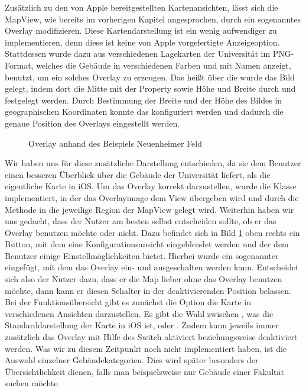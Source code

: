 \documentclass{report}
\begin{document}
Zusätzlich zu den von Apple bereitgestellten Kartenansichten, lässt sich die MapView, wie bereits im vorherigen Kapitel angesprochen, durch ein sogenanntes Overlay modifizieren. Diese Kartendarstellung ist ein wenig aufwendiger zu implementieren, denn diese ist keine von Apple vorgefertigte Anzeigeoption. Stattdessen wurde dazu aus verschiedenen Lagekarten der Universität im PNG-Format, welches die Gebäude in verschiedenen Farben und mit Namen anzeigt, benutzt, um ein solches Overlay zu erzeugen. Das heißt über die  wurde das Bild gelegt, indem dort die Mitte mit der Property  sowie Höhe und Breite durch  und  festgelegt werden. Durch Bestimmung der Breite  und der Höhe  des Bildes in geographischen Koordinaten konnte das  konfiguriert werden und dadurch die genaue Position des Overlays eingestellt werden. 

\begin{figure}[ht]
\centering {}
\caption{Overlay anhand des Beispiels Neuenheimer Feld}\label{bild_4}
\end{figure}

Wir haben uns für diese zusätzliche Darstellung entschieden, da sie dem Benutzer einen besseren Überblick über die Gebäude der Universität liefert, als die eigentliche Karte in iOS. Um das Overlay korrekt darzustellen, wurde die Klasse  implementiert, in der das Overlayimage dem View übergeben wird und durch die Methode  in die jeweilige Region der MapView gelegt wird. Weiterhin haben wir uns gedacht, dass der Nutzer am besten selbst entscheiden sollte, ob er das Overlay benutzen möchte oder nicht. Dazu befindet sich in Bild \ref{bild_4} oben rechts ein Button, mit dem eine Konfigurationsansicht eingeblendet werden und der dem Benutzer einige Einstellmöglichkeiten bietet. Hierbei wurde ein sogenannter  eingefügt, mit dem das Overlay ein- und ausgeschalten werden kann. Entscheidet sich also der Nutzer dazu, dass er die Map lieber ohne das Overlay benutzen möchte, dann kann er diesen Schalter in der deaktivierenden Position belassen. Bei der Funktionsübersicht gibt es zunächst die Option die Karte in verschiedenen Ansichten darzustellen. Es gibt die Wahl zwischen , was die Standarddarstellung der Karte in iOS ist,  oder . Zudem kann jeweils immer zusätzlich das Overlay mit Hilfe des Switch aktiviert beziehungsweise deaktiviert werden. Was wir zu diesem Zeitpunkt noch nicht implementiert haben, ist die Auswahl einzelner Gebäudekategorien. Dies wird später besonders der Übersichtlichkeit dienen, falls man beispielsweise nur Gebäude einer Fakultät suchen möchte.
\end{document}
